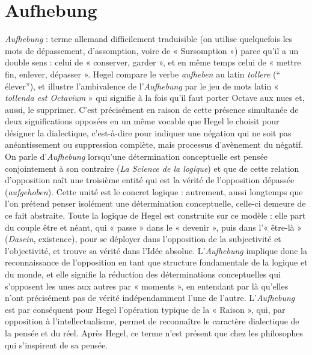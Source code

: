 
\chapter{Aufhebung}

{\it Aufhebung} : terme allemand difficilement
traduisible (on utilise quelquefois les mots
de dépassement, d’assomption, voire de
« Sursomption ») parce qu’il a un double
sens : celui de « conserver, garder », et en
même temps celui de « mettre fin, enlever,
dépasser ». Hegel compare le verbe {\it aufheben} au latin {\it tollere} (“\,élever\;”), et illustre l’ambivalence
de l’{\it Aufhebung} par le jeu de mots latin
« {\it tollenda est Octavium} » qui signifie à la
fois qu’il faut porter Octave aux nues et,
aussi, le supprimer. C’est précisément en
raison de cette présence simultanée de
deux significations opposées en un même
vocable que Hegel le choisit pour désigner
la dialectique, c’est-à-dire pour indiquer
une négation qui ne soit pas anéantissement ou suppression complète, mais processus d’avènement du négatif. On parle
d'{\it Aufhebung} lorsqu'une détermination
conceptuelle est pensée conjointement à
son contraire ({\it La Science de la logique}) et
que de cette relation d’opposition naît une
troisième entité qui est la vérité de l’opposition dépassée ({\it aufgehoben}). Cette unité
est le concret logique : autrement, aussi
longtemps que l’on prétend penser isolément une détermination conceptuelle,
celle-ci demeure de ce fait abstraite. Toute
la logique de Hegel est construite sur ce
modèle : elle part du couple être et néant,
qui « passe » dans le « devenir », puis dans
l’« être-là » ({\it Dasein}, existence), pour se
déployer dans l’opposition de la subjectivité et l’objectivité, et trouve sa vérité dans
l’Idée absolue. L’{\it Aufhebung} implique
donc la reconnaissance de l’opposition en
tant que structure fondamentale de la
logique et du monde, et elle signifie la
réduction des déterminations conceptuelles qui s'opposent les unes aux autres
par « moments », en entendant par là
qu'elles n’ont précisément pas de vérité
indépendamment l’une de l’autre. L’{\it Aufhebung} est par conséquent pour Hegel
l'opération typique de la « Raison », qui,
par opposition à l’intellectualisme, permet
de reconnaître le caractère dialectique de
la pensée et du réel. Après Hegel, ce terme
n'est présent que chez les philosophes qui
s’inspirent de sa pensée.


